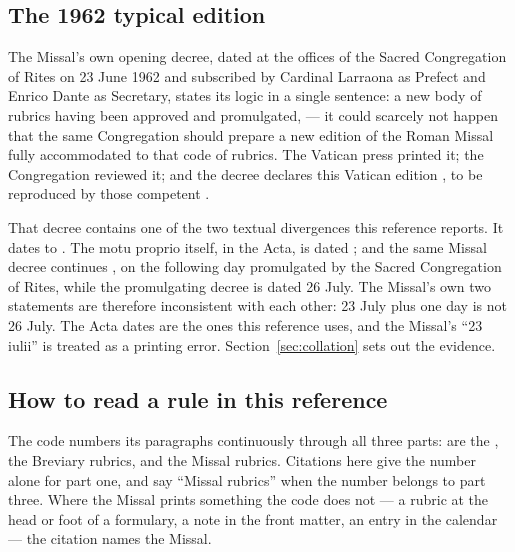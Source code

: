 \subsection{The 1962 typical edition}

The Missal's own opening decree, dated at the offices of the Sacred Congregation of Rites on
23 June 1962 and subscribed by Cardinal Larraona as Prefect and Enrico Dante as Secretary,
states its logic in a single sentence: a new body of rubrics having been approved and
promulgated,  — it could scarcely
not happen that the same Congregation should prepare a new edition of the Roman Missal fully
accommodated to that code of rubrics. The Vatican press printed it; the Congregation reviewed
it; and the decree declares this Vatican edition , to be reproduced by those
competent .

That decree contains one of the two textual divergences this reference reports. It dates
 to . The motu proprio itself,
in the Acta, is dated ; and the same Missal decree
continues , on the following day
promulgated by the Sacred Congregation of Rites, while the promulgating decree is dated 26 July.
The Missal's own two statements are therefore inconsistent with each other: 23 July plus one day
is not 26 July. The Acta dates are the ones this reference uses, and the Missal's ``23 iulii''
is treated as a printing error. Section~\ref{sec:collation} sets out the evidence.

\subsection{How to read a rule in this reference}

The code numbers its paragraphs continuously through all three parts:  are the
,  the Breviary rubrics, and  the Missal
rubrics. Citations here give the number alone for part one, and say ``Missal rubrics'' when the
number belongs to part three. Where the Missal prints something the code does not — a rubric at
the head or foot of a formulary, a note in the front matter, an entry in the calendar — the
citation names the Missal.

